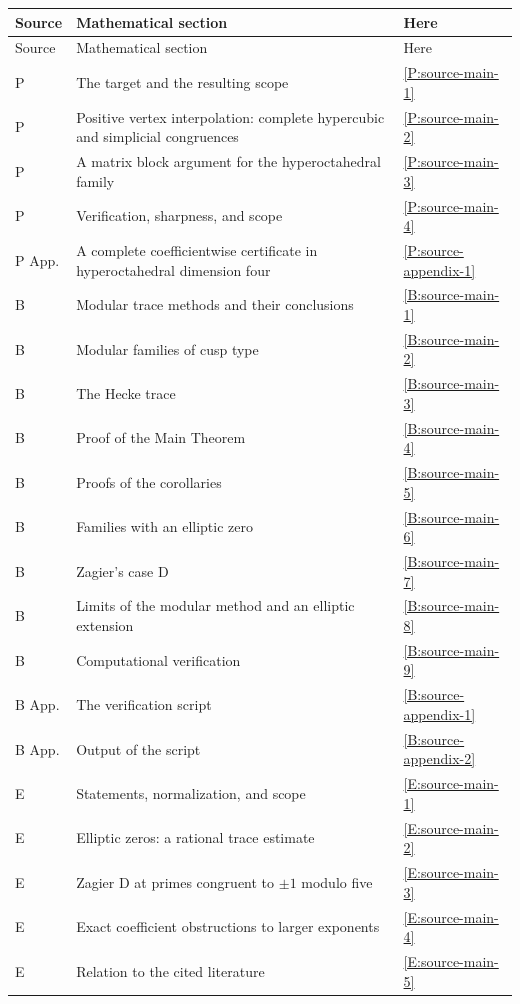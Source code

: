 \documentclass[11pt,a4paper]{article}
\theoremstyle{definition}\newtheorem{definition}[theorem]{Definition}
\theoremstyle{remark}\newtheorem{remark}[theorem]{Remark}
\numberwithin{equation}{section}
\begin{document}
\begin{longtable}{@{}p{}p{}p{}@{}}
\toprule Source & Mathematical section & Here\\\midrule\endfirsthead
\toprule Source & Mathematical section & Here\\\midrule\endhead
P & The target and the resulting scope & \ref{P:source-main-1}\\
P & Positive vertex interpolation: complete hypercubic and simplicial congruences & \ref{P:source-main-2}\\
P & A matrix block argument for the hyperoctahedral family & \ref{P:source-main-3}\\
P & Verification, sharpness, and scope & \ref{P:source-main-4}\\
P App. & A complete coefficientwise certificate in hyperoctahedral dimension four & \ref{P:source-appendix-1}\\
B & Modular trace methods and their conclusions & \ref{B:source-main-1}\\
B & Modular families of cusp type & \ref{B:source-main-2}\\
B & The Hecke trace & \ref{B:source-main-3}\\
B & Proof of the Main Theorem & \ref{B:source-main-4}\\
B & Proofs of the corollaries & \ref{B:source-main-5}\\
B & Families with an elliptic zero & \ref{B:source-main-6}\\
B & Zagier's case D & \ref{B:source-main-7}\\
B & Limits of the modular method and an elliptic extension & \ref{B:source-main-8}\\
B & Computational verification & \ref{B:source-main-9}\\
B App. & The verification script & \ref{B:source-appendix-1}\\
B App. & Output of the script & \ref{B:source-appendix-2}\\
E & Statements, normalization, and scope & \ref{E:source-main-1}\\
E & Elliptic zeros: a rational trace estimate & \ref{E:source-main-2}\\
E & Zagier D at primes congruent to \texorpdfstring{$\pm1$}{plus or minus one} modulo five & \ref{E:source-main-3}\\
E & Exact coefficient obstructions to larger exponents & \ref{E:source-main-4}\\
E & Relation to the cited literature & \ref{E:source-main-5}\\

\end{longtable}
\end{document}
